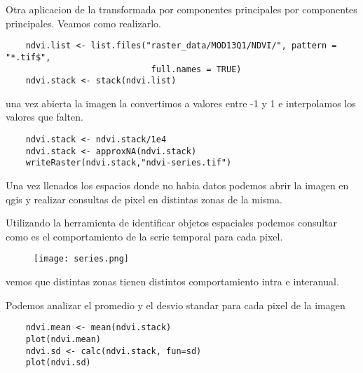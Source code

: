 \begin{exa}
    Otra aplicacion de la transformada por componentes principales por
    componentes principales. Veamos como realizarlo.
    \begin{lstlisting}
    ndvi.list <- list.files("raster_data/MOD13Q1/NDVI/", pattern = "*.tif$",
                             full.names = TRUE)
    ndvi.stack <- stack(ndvi.list)
    \end{lstlisting}
    una vez abierta la imagen la convertimos a valores entre -1 y 1 e
    interpolamos los valores que falten.
    \begin{lstlisting}
    ndvi.stack <- ndvi.stack/1e4
    ndvi.stack <- approxNA(ndvi.stack)
    writeRaster(ndvi.stack,"ndvi-series.tif")
    \end{lstlisting}
    Una vez llenados los espacios donde no habia datos podemos abrir la imagen
    en qgis y realizar consultas de pixel en distintas zonas de la misma.

    Utilizando la herramienta de identificar objetos espaciales podemos
    consultar como es el comportamiento de la serie temporal para cada pixel.
    \begin{figure}
    \begin{center}
        \texttt{[image: series.png]}
    \end{center}
    \caption{}
    \label{fig:series}
    \end{figure}
    vemos que distintas zonas tienen distintos comportamiento intra e
    interanual.

    Podemos analizar el promedio y el desvio standar para cada pixel de la
    imagen
    \begin{lstlisting}
    ndvi.mean <- mean(ndvi.stack)
    plot(ndvi.mean)
    ndvi.sd <- calc(ndvi.stack, fun=sd)
    plot(ndvi.sd)
    \end{lstlisting}
\end{exa}

